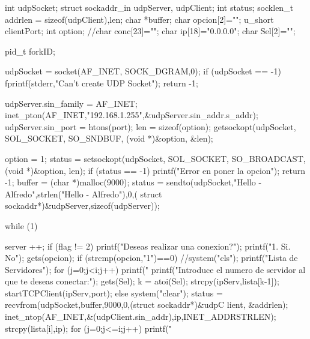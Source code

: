 \begin{DoxyCode}
                                       {
        int udpSocket;
        struct sockaddr_in udpServer, udpClient;
        int status;
        socklen_t addrlen = sizeof(udpClient),len;
        char *buffer;
        char opcion[2]="";
        u_short clientPort;
        int option;     
        //char conc[23]="";     
        char ip[18]="0.0.0.0";  
        char Sel[2]="";         

        pid_t forkID;
        

        udpSocket = socket(AF_INET, SOCK_DGRAM,0);
        if (udpSocket == -1) {
                fprintf(stderr,"Can't create UDP Socket");
                return -1;
        }
        
        udpServer.sin_family = AF_INET;
        inet_pton(AF_INET,"192.168.1.255",&udpServer.sin_addr.s_addr);
        udpServer.sin_port = htons(port);
        len = sizeof(option);
        getsockopt(udpSocket, SOL_SOCKET, SO_SNDBUF, (void *)&option, &len);

        option = 1;
        status = setsockopt(udpSocket, SOL_SOCKET, SO_BROADCAST, (void *)&option,
       len);
        if (status == -1) {
                printf("Error en poner la opcion\n");   
                return -1;
        }
        buffer = (char *)malloc(9000);
        status = sendto(udpSocket,"Hello - Alfredo",strlen("Hello - Alfredo"),0,(
      struct sockaddr*)&udpServer,sizeof(udpServer));
        
        while (1){
                server ++;
                if (flag != 2){
                        printf("Deseas realizar una conexion?\n");
                        printf("1. Si. No\n");
                        gets(opcion);
                        if (strcmp(opcion,"1")==0){
                                //system("cls");
                                printf("Lista de Servidores\n\n");
                                for (j=0;j<i;j++){
                                        printf("\n%
                                }
                                printf("Introduce el numero de servidor al que te
       deseas conectar:\n");
                                gets(Sel);
                                k = atoi(Sel);
                                strcpy(ipServ,lista[k-1]);
                                startTCPClient(ipServ,port);
                }
                else {
                        system("clear");        
                }
                }
                status = recvfrom(udpSocket,buffer,9000,0,(struct sockaddr*)&udpC
      lient, &addrlen);
                inet_ntop(AF_INET,&(udpClient.sin_addr),ip,INET_ADDRSTRLEN);
                strcpy(lista[i],ip);
                for (j=0;j<=i;j++){
                        printf("\n%
                }
        
}}
\end{DoxyCode}

